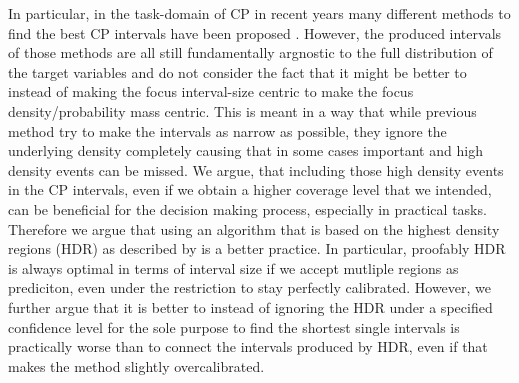 In particular, in the task-domain of CP in recent years many different methods to find the best CP intervals have been proposed \cite{sesia2021conformal, chernozhukov2021distributional, izbicki2022cd}. However, the produced intervals of those methods are all still fundamentally argnostic to the full distribution of the target variables and do not consider the fact that it might be better to instead of making the focus interval-size centric to make the focus density/probability mass centric. This is meant in a way that while previous method try to make the intervals as narrow as possible, they ignore the underlying density completely causing that in some cases important and high density events can be missed. We argue, that including those high density events in the CP intervals, even if we obtain a higher coverage level that we intended, can be beneficial for the decision making process, especially in practical tasks. Therefore we argue that using an algorithm that is based on the highest density regions (HDR) as described by \cite{hyndman1996computing} is a better practice. In particular, proofably HDR is always optimal in terms of interval size if we accept mutliple regions as prediciton, even under the restriction to stay perfectly calibrated. However, we further argue that it is better to instead of ignoring the HDR under a specified confidence level for the sole purpose to find the shortest single intervals is practically worse than to connect the intervals produced by HDR, even if that makes the method slightly overcalibrated.

